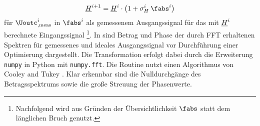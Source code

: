\documentclass[../Report.tex]{subfiles}
\begin{document}
\begin{align}
\label{eq:opt.Hnew}
	\Hcompl^{i+1}
		=\Hcompl^{i} \cdot
		\left( 1 + \sigma_H^i \: \fabs^{i}	\right)					 
\end{align}
für $\Uoutc_{, \mathrm{meas}}^{i}$ in $\fabs^{i}$ als gemessenem Ausgangssignal für das mit $\underline{H}^{i}$ berechnete Eingangssignal
\footnote{Nachfolgend wird aus Gründen der Übersichtlichkeit $\fabs$ statt dem länglichen Bruch genutzt.}.
In  sind Betrag und Phase der durch FFT erhaltenen Spektren für gemessenes und ideales Ausgangssignal vor Durchführung einer Optimierung dargestellt. Die Transformation erfolgt dabei durch die Erweiterung \lstinline{numpy} in Python mit \lstinline{numpy.fft}. Die Routine nutzt einen Algorithmus von Cooley and Tukey \cite[S. 297-301]{cooley65}.
Klar erkennbar sind die Nulldurchgänge des Betragsspektrums sowie die große Streuung der Phasenwerte. 
\\

 \absSpectIdeal 
{} \absSpectMeas
{} \angleSpectIdeal 
{} \angleSpectMeas 
\end{document}
